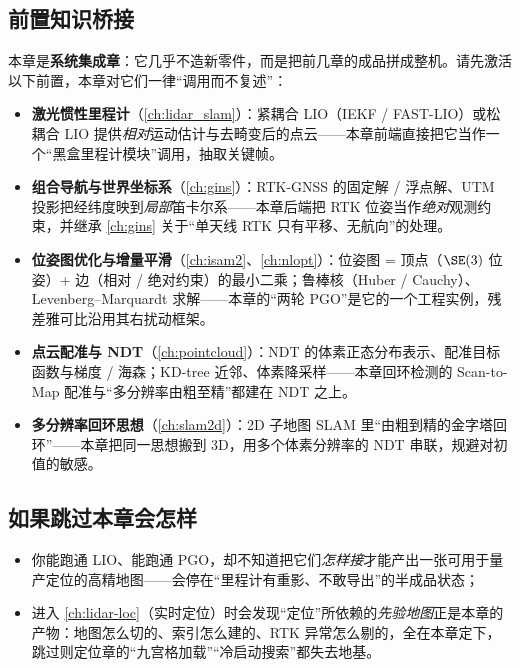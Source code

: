 \subsection*{前置知识桥接}
本章是\textbf{系统集成章}：它几乎不造新零件，而是把前几章的成品拼成整机。请先激活以下前置，本章对它们一律“调用而不复述”：
\begin{itemize}
  \item \textbf{激光惯性里程计}（\cref{ch:lidar_slam}）：紧耦合 LIO（IEKF / FAST-LIO）或松耦合 LIO 提供\emph{相对}运动估计与去畸变后的点云——本章前端直接把它当作一个“黑盒里程计模块”调用，抽取关键帧。
  \item \textbf{组合导航与世界坐标系}（\cref{ch:gins}）：RTK-GNSS 的固定解 / 浮点解、UTM 投影把经纬度映到\emph{局部}笛卡尔系——本章后端把 RTK 位姿当作\emph{绝对}观测约束，并继承 \cref{ch:gins} 关于“单天线 RTK 只有平移、无航向”的处理。
  \item \textbf{位姿图优化与增量平滑}（\cref{ch:isam2}、\cref{ch:nlopt}）：位姿图 = 顶点（$\SE(3)$ 位姿）+ 边（相对 / 绝对约束）的最小二乘；鲁棒核（Huber / Cauchy）、Levenberg–Marquardt 求解——本章的“两轮 PGO”是它的一个工程实例，残差雅可比沿用其右扰动框架。
  \item \textbf{点云配准与 NDT}（\cref{ch:pointcloud}）：NDT 的体素正态分布表示、配准目标函数与梯度 / 海森；KD-tree 近邻、体素降采样——本章回环检测的 Scan-to-Map 配准与“多分辨率由粗至精”都建在 NDT 之上。
  \item \textbf{多分辨率回环思想}（\cref{ch:slam2d}）：2D 子地图 SLAM 里“由粗到精的金字塔回环”——本章把同一思想搬到 3D，用多个体素分辨率的 NDT 串联，规避对初值的敏感。
\end{itemize}

\subsection*{如果跳过本章会怎样}
\begin{itemize}
  \item 你能跑通 LIO、能跑通 PGO，却不知道把它们\emph{怎样接}才能产出一张可用于量产定位的高精地图——会停在“里程计有重影、不敢导出”的半成品状态；
  \item 进入 \cref{ch:lidar-loc}（实时定位）时会发现“定位”所依赖的\emph{先验地图}正是本章的产物：地图怎么切的、索引怎么建的、RTK 异常怎么剔的，全在本章定下，跳过则定位章的“九宫格加载”“冷启动搜索”都失去地基。
\end{itemize}

